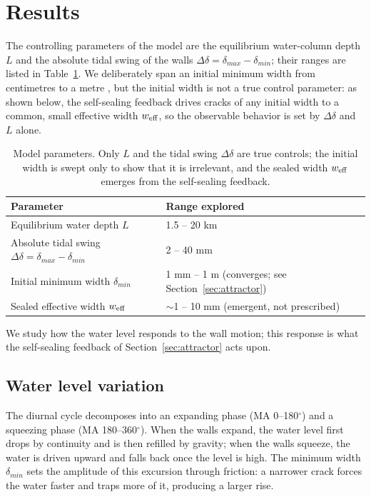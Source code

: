 \documentclass[draft]{agujournal2019}
\begin{document}
\section{Results}
The controlling parameters of the model are the equilibrium water-column depth $L$ and the absolute tidal swing of the walls $\Delta\delta=\delta_{max}-\delta_{min}$; their ranges are listed in Table~\ref{tbl:enc:model_parameters}. We deliberately span an initial minimum width from centimetres \cite{nakajima2016controlled} to a metre \cite{kite2016sustained}, but the initial width is not a true control parameter: as shown below, the self-sealing feedback drives cracks of any initial width to a common, small effective width $w_{\rm eff}$, so the observable behavior is set by $\Delta\delta$ and $L$ alone.

\begin{table}[hbt!]
    \centering
    \begin{tabular}{l l}
        \hline
        \textbf{Parameter} & \textbf{Range explored} \\
        \hline
        Equilibrium water depth $L$ & 1.5 -- 20 km \\
        Absolute tidal swing $\Delta\delta=\delta_{max}-\delta_{min}$ & 2 -- 40 mm \\
        Initial minimum width $\delta_{min}$ & 1 mm -- 1 m (converges; see Section~\ref{sec:attractor}) \\
        Sealed effective width $w_{\rm eff}$ & $\sim$1 -- 10 mm (emergent, not prescribed) \\
        \hline
    \end{tabular}
    \caption{Model parameters. Only $L$ and the tidal swing $\Delta\delta$ are true controls; the initial width is swept only to show that it is irrelevant, and the sealed width $w_{\rm eff}$ emerges from the self-sealing feedback.}
    \label{tbl:enc:model_parameters}
\end{table}

We study how the water level responds to the wall motion; this response is what the self-sealing feedback of Section~\ref{sec:attractor} acts upon.

\subsection{Water level variation}
The diurnal cycle decomposes into an expanding phase (MA 0--180$^\circ$) and a squeezing phase (MA 180--360$^\circ$). When the walls expand, the water level first drops by continuity and is then refilled by gravity; when the walls squeeze, the water is driven upward and falls back once the level is high. The minimum width $\delta_{min}$ sets the amplitude of this excursion through friction: a narrower crack forces the water faster and traps more of it, producing a larger rise.
\end{document}
